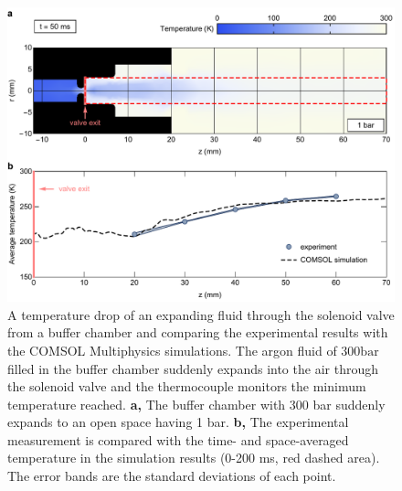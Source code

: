 \begin{figure}[t!]
\centering
\includegraphics[width=130mm]{figures/ch2/comsol/comsolSolenoid.pdf}
\caption{A temperature drop of an expanding fluid through the solenoid valve from a buffer chamber and comparing the experimental results with the COMSOL Multiphysics simulations. The argon fluid of $300 \text {bar}$ filled in the buffer chamber suddenly expands into the air through the solenoid valve and the thermocouple monitors the minimum temperature reached. \textbf{a,} The buffer chamber with 300 bar suddenly expands to an open space having 1 bar. \textbf{b,} The experimental measurement is compared with the time- and space-averaged temperature in the simulation results (0-200 ms, red dashed area). The error bands are the standard deviations of each point.}
\label{fig:comsolSolenoid}
\end{figure}

